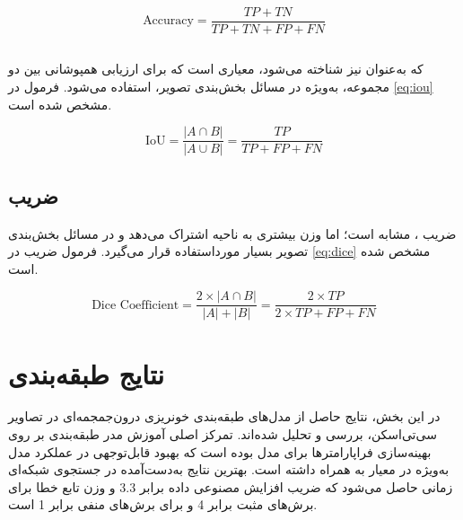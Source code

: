 \begin{latin}
\begin{equation}
\label{eq:accuracy}
\text{Accuracy} = \frac{TP + TN}{TP + TN + FP + FN}
\end{equation}
\end{latin}

\subsection{}

 که به‌عنوان  نیز شناخته می‌شود، معیاری است که برای ارزیابی همپوشانی بین دو مجموعه، به‌ویژه در مسائل بخش‌بندی تصویر، استفاده می‌شود. فرمول  در \autoref{eq:iou} مشخص شده است.

\begin{latin}
\begin{equation}
\label{eq:iou}
\text{IoU} = \frac{|A \cap B|}{|A \cup B|} = \frac{TP}{TP + FP + FN}
\end{equation}
\end{latin}

\subsection{ضریب
}

ضریب ، مشابه  است؛ اما وزن بیشتری به ناحیه اشتراک می‌دهد و در مسائل بخش‌بندی تصویر بسیار مورداستفاده قرار می‌گیرد. فرمول ضریب  در \autoref{eq:dice} مشخص شده است.

\begin{latin}
\begin{equation}
\label{eq:dice}
\text{Dice Coefficient} = \frac{2 \times |A \cap B|}{|A| + |B|} = \frac{2 \times TP}{2 \times TP + FP + FN}
\end{equation}
\end{latin}

\section{نتایج طبقه‌بندی}

در این بخش، نتایج حاصل از مدل‌های طبقه‌بندی خونریزی درون‌جمجمه‌ای در تصاویر سی‌تی‌اسکن، بررسی و تحلیل شده‌اند. تمرکز اصلی آموزش مدر طبقه‌بندی بر روی بهینه‌سازی فراپارامترها برای مدل
  بوده است که بهبود قابل‌توجهی در عملکرد مدل به‌ویژه در معیار 
   به ‌همراه داشته است. بهترین نتایج به‌دست‌آمده در جستجوی شبکه‌ای زمانی حاصل می‌شود که ضریب افزایش مصنوعی داده برابر 
   $3.3$
و وزن تابع خطا
برای برش‌های مثبت برابر 4 و برای برش‌های منفی برابر 1 است.

